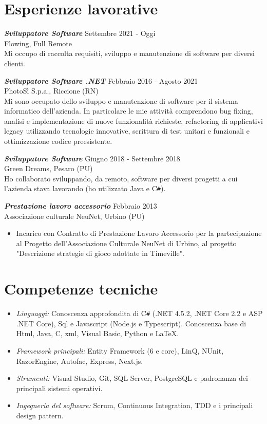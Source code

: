 \documentclass[margin, 10pt]{res} %
\begin{document}
\begin{resume}
\section{Esperienze lavorative}

{\sl \textbf{Sviluppatore Software}} \hfill Settembre 2021 - Oggi \\
Flowing, Full Remote \\
Mi occupo di raccolta requisiti, sviluppo e manutenzione di software per diversi clienti.

{\sl \textbf{Sviluppatore Software .NET}} \hfill Febbraio 2016 - Agosto 2021 \\
PhotoS\`i  S.p.a., Riccione (RN) \\
Mi sono occupato dello sviluppo e manutenzione di software per il sistema informatico dell'azienda. In particolare le mie attivit\`a comprendono bug fixing, analisi e implementazione di nuove funzionalit\`a richieste, refactoring di applicativi legacy utilizzando tecnologie innovative, scrittura di test unitari e funzionali e ottimizzazione codice preesistente.

{\sl \textbf{Sviluppatore Software}} \hfill Giugno 2018 - Settembre 2018 \\
Green Dreams, Pesaro (PU) \\
Ho collaborato sviluppando, da remoto, software per diversi progetti a cui l'azienda stava lavorando (ho utilizzato Java e C\texttt{\#}).

{\sl \textbf{Prestazione lavoro accessorio}} \hfill Febbraio 2013 \\
Associazione culturale NeuNet, Urbino (PU) 
\begin{itemize} %
\item Incarico con Contratto di Prestazione Lavoro Accessorio per la partecipazione al Progetto dell'Associazione Culturale NeuNet di Urbino, al progetto "Descrizione strategie di gioco adottate in Timeville". \\
\end{itemize}


\section{Competenze tecniche}

\begin{itemize}

\item {\sl Linguaggi:} Conoscenza approfondita di C\texttt{\#} (.NET 4.5.2, .NET Core 2.2 e ASP .NET Core), Sql e Javascript (Node.js e Typescript). Conoscenza base di Html, Java, C, xml, Visual Basic, Python e \LaTeX.
\item {\sl Framework principali:} Entity Framework (6 e core), LinQ, NUnit, RazorEngine, Autofac, Express, Next.js.
\item {\sl Strumenti:} Visual Studio, Git, SQL Server, PostgreSQL e padronanza dei principali sistemi operativi.
\item {\sl Ingegneria del software:} Scrum, Continuous Integration, TDD e i principali design pattern.


\end{itemize}
\end{resume}
\end{document}

